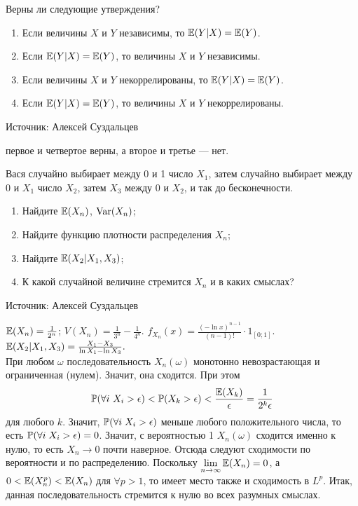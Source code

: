 \begin{problem}
Верны ли следующие утверждения?
\begin{enumerate}
  \item Если величины $X$ и $Y$ независимы, то $\E(Y|X)=\E(Y)$.
  \item Если $\E(Y|X)=\E(Y)$, то величины $X$ и $Y$ независимы.
  \item Если величины $X$ и $Y$ некоррелированы, то $\E(Y|X)=\E(Y)$.
  \item Если $\E(Y|X)=\E(Y)$, то величины $X$ и $Y$ некоррелированы.
\end{enumerate}

Источник: Алексей Суздальцев

\begin{sol}
 первое и четвертое верны, а второе и третье — нет.
\end{sol}
\end{problem}

\begin{problem}
 Вася случайно выбирает между 0 и 1 число $X_1$, затем случайно выбирает между 0 и $X_1$ число $X_2$, затем $X_3$ между 0 и $X_{2}$, и так до бесконечности.
\begin{enumerate}
  \item Найдите $\E(X_n)$, $\Var(X_n)$;
  \item Найдите функцию плотности распределения $X_n$;
  \item Найдите $\E(X_2|X_1,X_3)$;
\item К какой случайной величине стремится $X_n$ и в каких смыслах?
\end{enumerate}

Источник: Алексей Суздальцев

\begin{sol}

$\E(X_n)=\frac{1}{2^n}$; $V(X_n)=\frac{1}{3^n}-\frac{1}{4^n}$. $f_{X_n}(x)=\frac{(-\ln{x})^{n-1}}{(n-1)!}\cdot 1_{[0;1]}.$\\
$\E(X_2|X_1,X_3)=\frac{X_1-X_3}{\ln{X_1}-\ln{X_3}}.$\\
При любом $\omega$ последовательность $X_n(\omega)$ монотонно невозрастающая и ограниченная (нулем). Значит, она сходится. При этом
\[
 \P(\forall i \mbox{ } X_i>\epsilon)<\P(X_k>\epsilon)<\frac{\E(X_k)}{\epsilon}=\frac{1}{2^k\epsilon}
 \]
 для любого $k$. Значит, $\P(\forall i \; X_i>\epsilon)$ меньше любого положительного числа, то есть $\P(\forall i \; X_i>\epsilon)=0$. Значит, с вероятностью 1 $X_n(\omega)$ сходится именно к нулю, то есть $X_n\to 0$ почти наверное. Отсюда следуют сходимости по вероятности и по распределению. Поскольку $\lim\limits_{n\to \infty}\E(X_n)=0$, а $0<\E(X_n^p)<\E(X_n)$ для $\forall p>1$, то имеет место также и сходимость в $L^p$. Итак, данная последовательность стремится к нулю во всех разумных смыслах.
\end{sol}
\end{problem}

